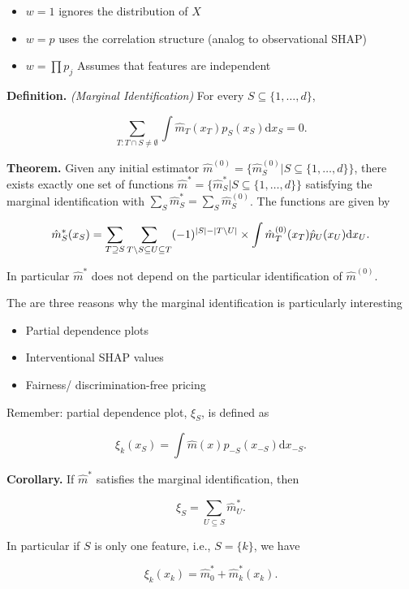 \documentclass[a4paper,10pt,openany]{book}
\providecommand{\tightlist}{%
 \setlength{\itemsep}{0pt}\setlength{\parskip}{0pt}}
\begin{document}
\begin{itemize}
\tightlist
\item
  \(w=1\) ignores the distribution of \(X\)
\item
  \(w=p\) uses the correlation structure (analog to observational SHAP)
\item
  \(w=\prod p_j\) Assumes that features are independent
\end{itemize}

\textbf{Definition.} \emph{(Marginal Identification)} For every \(S\subseteq \{1,\dots,d\}\),

\[
\sum_{T: T \cap S \neq \emptyset} \int  \hat m_T(x_T)  p_{S}(x_{S}) \mathrm dx_S=0.
\]

\textbf{Theorem.} Given any initial estimator \(\hat m^{(0)}=\{\hat m^{(0)}_S | S\subseteq \{1,\dots,d\}\}\),
there exists exactly one set of functions \(\hat m^\ast=\{\hat m^\ast_S | S\subseteq \{1,\dots,d\}\}\) satisfying the marginal identification with \(\sum_S \hat m^\ast_S = \sum_S \hat m^{(0)}_S\).
The functions are given by

\[
\hat m^\ast_S (x_S)=  \sum_{T \supseteq S} \sum_{T\setminus S \subseteq U\subseteq  T}(-1)^{|S|-|T\setminus U|} \times \int \hat m^{(0)}_T(x_T) \hat p_U(x_U)\mathrm dx_U. \notag
\]

In particular \(\hat m^\ast\) does not depend on the particular identification of \(\hat m^{(0)}\).

The are three reasons why the marginal identification is particularly interesting

\begin{itemize}
\tightlist
\item
  Partial dependence plots
\item
  Interventional SHAP values
\item
  Fairness/ discrimination-free pricing
\end{itemize}

Remember: partial dependence plot, \(\xi_S\), is defined as

\[
\xi_k(x_S)= \int \hat m(x) p_{-S}(x_{-S})\mathrm dx_{-S}.
\]

\textbf{Corollary.} If \(\hat m^{\ast}\) satisfies the marginal identification, then

\[
\xi_S=\sum_{U \subseteq S} \hat m_U^{\ast}.
\]

In particular if \(S\) is only one feature, i.e., \(S=\{k\}\), we have

\[
\xi_k(x_k)= \hat m_0^{\ast} + \hat m_k^\ast(x_k).
\]
\end{document}
